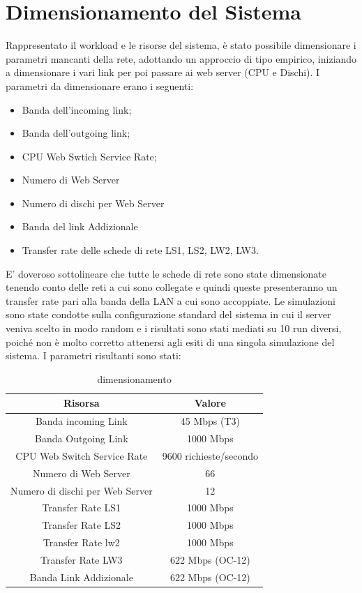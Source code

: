 \section{Dimensionamento del Sistema}
Rappresentato il workload e le risorse del sistema, è stato possibile dimensionare i parametri mancanti della rete, adottando un approccio di tipo empirico, iniziando a dimensionare i vari link per poi passare ai web server (CPU e Dischi). 
I parametri da dimensionare erano i seguenti:
\begin{itemize}
	\item Banda dell'incoming link;
	\item Banda dell'outgoing link;
	\item CPU Web Swtich Service Rate;
	\item Numero di Web Server
	\item Numero di dischi per Web Server
	\item Banda del link Addizionale
	\item Transfer rate delle schede di rete LS1, LS2, LW2, LW3.
\end{itemize}
E' doveroso sottolineare che tutte le schede di rete sono state dimensionate tenendo conto delle reti a cui sono collegate e quindi queste presenteranno un transfer rate pari alla banda della LAN a cui sono accoppiate. Le simulazioni sono state condotte sulla configurazione standard del sistema in cui il server veniva scelto in modo random e  i risultati sono stati mediati su 10 run diversi, poiché non è molto corretto attenersi agli esiti di una singola simulazione del sistema. I parametri risultanti sono stati:
\begin{table}[H]
\begin{center}
\begin{tabular}{||c|c||}
\hline
Risorsa							&Valore\\
\hline
Banda incoming Link				&45 Mbps (T3)\\
\hline	
Banda Outgoing Link				&1000 Mbps\\
\hline
CPU Web Switch Service Rate		&9600 richieste/secondo\\
\hline
Numero di Web Server			&66\\
\hline
Numero di dischi per Web Server	&12\\
\hline
Transfer Rate LS1				&1000 Mbps\\
\hline
Transfer Rate LS2				&1000 Mbps\\
\hline
Transfer Rate lw2		&1000 Mbps\\
\hline
Transfer Rate LW3		&622 Mbps (OC-12)\\
\hline
Banda Link Addizionale	&622 Mbps (OC-12)\\
\hline
\end{tabular}
\end{center}
\caption{dimensionamento}
\label{test_4}
\end{table}

